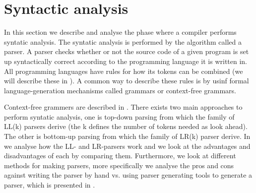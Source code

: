 \section{Syntactic analysis}

In this section we describe and analyse the phase where a compiler performs
syntatic analysis. The syntatic analysis is performed by the algorithm called a
parser. A parser checks whether or not the source code of a
given program is set up syntactically correct according to the programming
language it is written in. All programming languages have rules for how its
tokens can be combined (we will describe these in ).
A common way to describe these rules is by usinf formal language-generation
mechanisms called grammars or context-free grammars. 

Context-free grammers are described in .
There exists two main approaches to perform syntatic analysis, one is
top-down parsing from which the family of LL(k) parsers derive (the k
defines the number of tokens needed as look ahead). The other is bottom-up 
parsing from which the family of LR(k) parser derive.  In
 we analyse how the LL- and
LR-parsers work and we look at the advantages and disadvantages of each by
comparing them. Furthermore, we look at different methods for making parsers,
more specifically we analyse the pros and cons against writing the parser by
hand vs. using parser generating tools to generate a parser, which is presented 
in .





